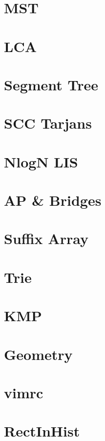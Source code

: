 \documentclass[twocolumn]{article}
\begin{document}
{    \newpage

    \section{MST}
    

    \newpage

    \section{LCA}
    

    \newpage

    \section{Segment Tree}
    
    \section{SCC Tarjans}
    
    \section{NlogN LIS}
    

    \newpage

    \section{AP \& Bridges}
    
    
    \newpage

    \section{Suffix Array}
    

    \newpage

    \section{Trie}
    
    \section{KMP}
    
    \section{Geometry}
    

    \newpage

    \section{vimrc}
    
    \section{RectInHist}
    
}
\end{document}
